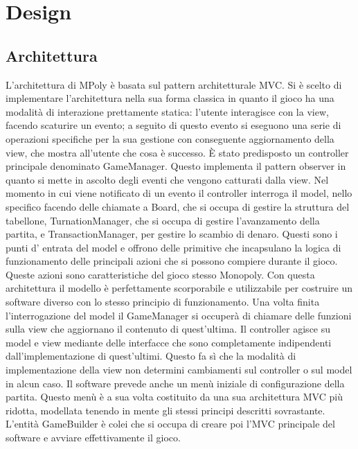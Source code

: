 \chapter{Design}

\section{Architettura}
L’architettura di MPoly è basata sul pattern architetturale MVC. 
Si è scelto di implementare l’architettura nella sua forma classica in quanto il gioco 
ha una modalità di interazione prettamente statica: l’utente interagisce con la view, 
facendo scaturire un evento; a seguito di questo evento si eseguono una serie di operazioni 
specifiche per la sua gestione con conseguente aggiornamento della view, che mostra all’utente che cosa è successo.   
È stato predisposto un controller principale denominato GameManager. 
Questo implementa il pattern observer in quanto si mette in ascolto degli eventi che vengono catturati dalla view. 
Nel momento in cui viene notificato di un evento il controller interroga il model, 
nello specifico facendo delle chiamate a Board, che si occupa di gestire la struttura del tabellone,
TurnationManager, che si occupa di gestire l’avanzamento della partita, 
e TransactionManager, per gestire lo scambio di denaro. 
Questi sono i punti d’ entrata del model e offrono delle primitive che incapsulano la logica di funzionamento 
delle principali azioni che si possono compiere durante il gioco. Queste azioni sono caratteristiche del 
gioco stesso Monopoly. 
Con questa architettura il modello è perfettamente scorporabile e utilizzabile per costruire 
un software diverso con lo stesso principio di funzionamento. 
Una volta finita l’interrogazione del model il GameManager si occuperà di chiamare 
delle funzioni sulla view che aggiornano il contenuto di quest’ultima. 
Il controller agisce su model e view mediante delle interfacce che sono completamente indipendenti 
dall’implementazione di quest’ultimi. 
Questo fa sì che la modalità di implementazione della view non determini cambiamenti sul 
controller o sul model in alcun caso. 
Il software prevede anche un menù iniziale di configurazione della partita. 
Questo menù è a sua volta costituito da una sua architettura MVC più ridotta, 
modellata tenendo in mente gli stessi principi descritti sovrastante. 
L’entità GameBuilder è colei che si occupa di creare poi l’MVC principale del software e avviare effettivamente il gioco.
